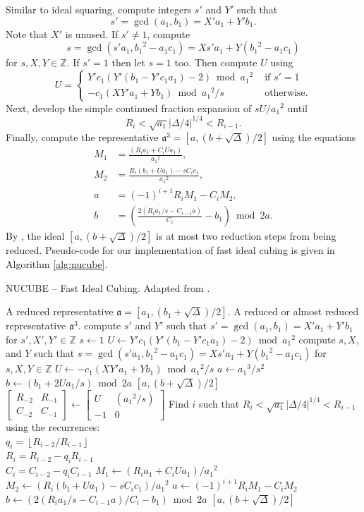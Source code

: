 \documentclass{ucalgthes1}
\theoremstyle{definition}
\newcommand{\ZZ}{\mathbb{Z}}
\newcommand{\matrixtt}[4]{\left[ \begin{array}{rr} #1 & #2 \\ #3 & #4 \end{array} \right]}
\newcommand{\floor}[1]{\left\lfloor #1 \right\rfloor}
\begin{document}
Similar to ideal squaring, compute integers $s'$ and $Y'$ such that
\[
s' = \gcd(a_1, b_1) = X'a_1 + Y'b_1.
\]
Note that $X'$ is unused. If $s' \neq 1$, compute
\[
s = \gcd(s'a_1, {b_1}^2 - a_1c_1) = Xs'a_1 + Y({b_1}^2 - a_1c_1)
\]
for $s, X, Y \in \ZZ$.  If $s' = 1$ then let $s = 1$ too.  Then compute $U$ using
\[
U = \begin{cases}
		Y'c_1(Y'(b_1 - Y'c_1a_1) - 2) \bmod {a_1}^2 & \textrm{ if } s' = 1 \\
		-c_1(XY'a_1+Yb_1) \bmod {a_1}^2/s & \textrm{ otherwise.}
    \end{cases}
\]
Next, develop the simple continued fraction expansion of $sU/{a_1}^2$ until
\[
	R_i < \sqrt{a_1}|\Delta/4|^{1/4} < R_{i-1}.
\]
Finally, compute the representative $\mathfrak a^3 = [a, (b + \sqrt\Delta)/2]$ using the equations
\begin{align*}
	M_1 &= \frac{(R_ia_1 + C_iUa_1)}{{a_1}^2}, \\
	M_2 &= \frac{R_i(b_1 + Ua_1) - sC_ic_1}{{a_1}^2}, \\
	a &= (-1)^{i+1} R_i M_1 - C_i M_2, \\
	b &= \left( \frac{2(R_ia_1/s - C_{i-1}a)}{C_i} - b_1 \right) \bmod 2a.
\end{align*}
By \cite[p.15~Theorem~5.1]{Imbert2010}, the ideal $[a, (b + \sqrt\Delta)/2]$ is at most two reduction steps from being reduced.  Pseudo-code for our implementation of fast ideal cubing is given in Algorithm \ref{alg:nucube}.

\begin{algorithm}[h]
\caption{NUCUBE -- Fast Ideal Cubing. Adapted from \cite[p.26]{Imbert2010}.}
\label{alg:nucube}
\begin{algorithmic}[1]
\REQUIRE A reduced representative $\mathfrak a = [a_1, (b_1+\sqrt\Delta)/2]$.
\ENSURE A reduced or almost reduced representative $\mathfrak a^3$.
\STATE compute $s'$ and $Y'$ such that $s' = \gcd(a_1, b_1) = X'a_1 + Y'b_1$ for $s', X', Y' \in \ZZ$
	\STATE $s \gets 1$
	\STATE $U \gets Y'c_1(Y'(b_1 - Y'c_1a_1) - 2) \bmod {a_1}^2$
\ELSE
	\STATE compute $s, X$, and $Y$ such that $s = \gcd(s'a_1, {b_1}^2 - a_1c_1) = Xs'a_1 + Y({b_1}^2 - a_1c_1)$ for $s, X, Y \in \ZZ$
	\STATE $U \gets -c_1(XY'a_1+Yb_1) \bmod {a_1}^2/s$
\ENDIF
{}
	\STATE $a \gets {a_1}^3/s^2$
	\STATE $b \gets (b_1 + 2Ua_1/s) \bmod 2a$
	\RETURN $[a, (b+\sqrt\Delta)/2]$
\ENDIF
\STATE $\matrixtt{R_{-2}}{R_{-1}}{C_{-2}}{C_{-1}} \gets \matrixtt{U}{({a_1}^2/s)}{-1}{0}$
\STATE Find $i$ such that $R_i < \sqrt{a_1} |\Delta/4|^{1/4} < R_{i-1}$ using the recurrences: \\
       $q_i = \floor{R_{i-2}/R_{i-1}}$ \\
       $R_i = R_{i-2}-q_i R_{i-1}$ \\
       $C_i=C_{i-2}-q_i C_{i-1}$
\STATE $M_1 \gets (R_ia_1 + C_iUa_1) / {a_1}^2$
\STATE $M_2 \gets (R_i(b_1 + Ua_1) - sC_ic_1) / {a_1}^2$
\STATE $a \gets (-1)^{i+1} R_i M_1 - C_i M_2$
\STATE $b \gets (2(R_ia_1/s - C_{i-1}a)/C_i - b_1) \bmod 2a$
\RETURN $[a, (b+\sqrt\Delta)/2]$
\end{algorithmic}
\end{algorithm}
\end{document}

